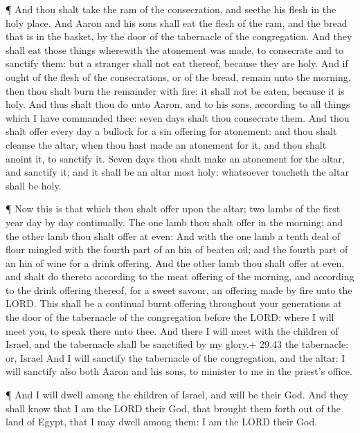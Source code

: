  ¶ And thou shalt take the ram of the consecration, and
seethe his flesh in the holy place.  And Aaron and his sons
shall eat the flesh of the ram, and the bread that is in the basket, by
the door of the tabernacle of the congregation.  And they
shall eat those things wherewith the atonement was made, to consecrate
and to sanctify them: but a stranger shall not eat thereof, because they
are holy.  And if ought of the flesh of the consecrations,
or of the bread, remain unto the morning, then thou shalt burn the
remainder with fire: it shall not be eaten, because it is holy.
 And thus shalt thou do unto Aaron, and to his sons,
according to all things which I have commanded thee: seven days shalt
thou consecrate them.  And thou shalt offer every day a
bullock for a sin offering for atonement: and thou shalt cleanse the
altar, when thou hast made an atonement for it, and thou shalt anoint
it, to sanctify it.  Seven days thou shalt make an
atonement for the altar, and sanctify it; and it shall be an altar most
holy: whatsoever toucheth the altar shall be holy.

 ¶ Now this is that which thou shalt offer upon the altar;
two lambs of the first year day by day continually.  The
one lamb thou shalt offer in the morning; and the other lamb thou shalt
offer at even:  And with the one lamb a tenth deal of flour
mingled with the fourth part of an hin of beaten oil; and the fourth
part of an hin of wine for a drink offering.  And the other
lamb thou shalt offer at even, and shalt do thereto according to the
meat offering of the morning, and according to the drink offering
thereof, for a sweet savour, an offering made by fire unto the LORD.
 This shall be a continual burnt offering throughout your
generations at the door of the tabernacle of the congregation before the
LORD: where I will meet you, to speak there unto thee.  And
there I will meet with the children of Israel, and the tabernacle shall
be sanctified by my glory.+ 29.43 the tabernacle: or, Israel
 And I will sanctify the tabernacle of the congregation,
and the altar: I will sanctify also both Aaron and his sons, to minister
to me in the priest's office.

 ¶ And I will dwell among the children of Israel, and will
be their God.  And they shall know that I am the LORD their
God, that brought them forth out of the land of Egypt, that I may dwell
among them: I am the LORD their God.

